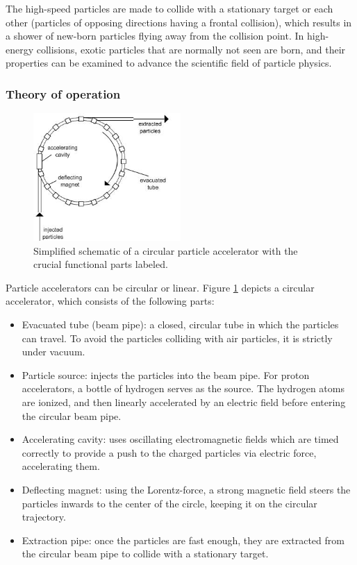 \documentclass[12pt]{article}
\begin{document}
The high-speed particles are made to collide with a stationary target or each other (particles of opposing directions having a frontal collision), which results in a shower of new-born particles flying away from the collision point. In high-energy collisions, exotic particles that are normally not seen are born, and their properties can be examined to advance the scientific field of particle physics.

\subsubsection{Theory of operation}\label{sec_part_accel_theory}

\begin{figure}[H]
	\begin{center}
		\includegraphics[width=0.5\textwidth]{particle_accelerator_schematic}
	\end{center}
	\caption{Simplified schematic of a circular particle accelerator with the crucial functional parts labeled.}
	\label{fig_part_accel_schematic}
\end{figure}

Particle accelerators can be circular or linear. Figure \ref{fig_part_accel_schematic} depicts a circular accelerator, which consists of the following parts:
\begin{itemize}
	\item Evacuated tube (beam pipe): a closed, circular tube in which the particles can travel. To avoid the particles colliding with air particles, it is strictly under vacuum.
	\item Particle source: injects the particles into the beam pipe. For proton accelerators, a bottle of hydrogen serves as the source. The hydrogen atoms are ionized, and then linearly accelerated by an electric field before entering the circular beam pipe.
	\item Accelerating cavity: uses oscillating electromagnetic fields which are timed correctly to provide a push to the charged particles via electric force, accelerating them.
	\item Deflecting magnet: using the Lorentz-force, a strong magnetic field steers the particles inwards to the center of the circle, keeping it on the circular trajectory.
	\item Extraction pipe: once the particles are fast enough, they are extracted from the circular beam pipe to collide with a stationary target.
\end{itemize}
\end{document}
